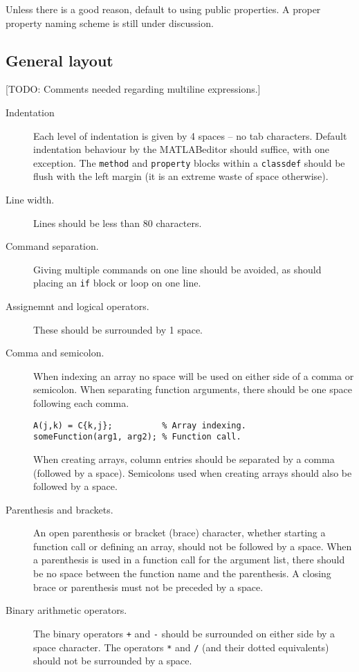 \documentclass[12pt]{article}
\newcommand{\matlab}{MATLAB}
\begin{document}
Unless there is a good reason, default to using public properties. A proper property naming scheme is still under discussion. %

\subsection{General layout}
[TODO: Comments needed regarding multiline expressions.]

\begin{description}
  \item[Indentation] Each level of indentation is given by 4 spaces -- no tab characters. Default indentation behaviour by the \matlab editor should suffice, with one exception. The \verb|method| and \verb|property| blocks within a \verb|classdef| should be flush with the left margin (it is an extreme waste of space otherwise).
  \item[Line width.] Lines should be less than 80 characters.
  \item[Command separation.] Giving multiple commands on one line should be avoided, as should placing an \verb|if| block or loop on one line.
  \item[Assignemnt and logical operators.] These should be surrounded by 1 space.
  \item[Comma and semicolon.] When indexing an array no space will be used on either side of a comma or semicolon. When separating function arguments, there should be one space following each comma.
    \begin{lstlisting}[frame=single]
A(j,k) = C{k,j};          % Array indexing.
someFunction(arg1, arg2); % Function call.
    \end{lstlisting}
    When creating arrays, column entries should be separated by a comma (followed by a space). Semicolons used when creating arrays should also be followed by a space.
  \item[Parenthesis and brackets.] An open parenthesis or bracket (brace) character, whether starting a function call or defining an array, should not be followed by a space. When a parenthesis is used in a function call for the argument list, there should be no space between the function name and the parenthesis. A closing brace or parenthesis must not be preceded by a space.
  \item[Binary arithmetic operators.] The binary operators \verb|+| and \verb|-| should be surrounded on either side by a space character. The operators \verb|*| and \verb|/| (and their dotted equivalents) should not be surrounded by a space.
\end{description}
\end{document}
